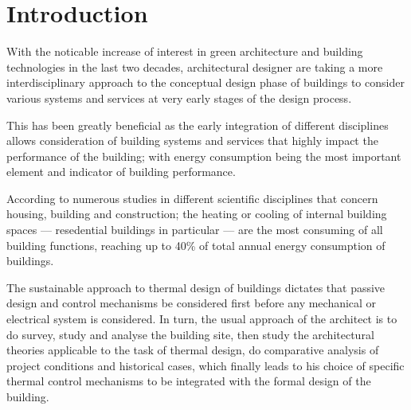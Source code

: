 


\frontmatter

\pagestyle{ruledsmallhd}
\setlength{\parskip}{0.7cm}

\maketitle

\cleardoublepage
\begin{abstract}

\end{abstract}


\cleardoublepage
\tableofcontents

\cleardoublepage
\listoffigures

\cleardoublepage
\listoftables

\cleardoublepage

\chapter{Introduction}

With the noticable increase of interest in green architecture and building technologies in the last two decades, architectural designer are taking a more interdisciplinary approach to the conceptual design phase of buildings to consider various systems and services at very early stages of the design process.

This has been greatly beneficial as the early integration of different disciplines allows consideration of building systems and services that highly impact the performance of the building; with energy consumption being the most important element and indicator of building performance.

According to numerous studies in different scientific disciplines that concern housing, building and construction; the heating or cooling of internal building spaces --- resedential buildings in particular --- are the most consuming of all building functions, reaching up to 40\% of total annual energy consumption of buildings.

The sustainable approach to thermal design of buildings dictates that passive design and control mechanisms be considered first before any mechanical or electrical system is considered. In turn, the usual approach of the architect is to do survey, study and analyse the building site, then study the architectural theories applicable to the task of thermal design, do comparative analysis of project conditions and historical cases, which finally leads to his choice of specific thermal control mechanisms to be integrated with the formal design of the building.

